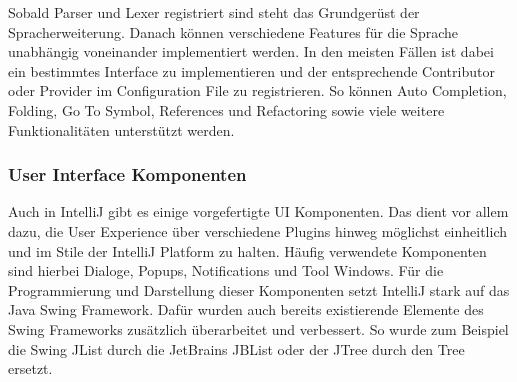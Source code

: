   Sobald Parser und Lexer registriert sind steht das Grundgerüst der Spracherweiterung. Danach können
  verschiedene Features für die Sprache unabhängig voneinander implementiert werden. In den meisten
  Fällen ist dabei ein bestimmtes Interface zu implementieren und der entsprechende Contributor oder
  Provider im Configuration File zu registrieren. So können Auto Completion, Folding, Go To Symbol,
  References und Refactoring sowie viele weitere Funktionalitäten unterstützt werden.

\subsubsection{User Interface Komponenten}
  Auch in IntelliJ gibt es einige vorgefertigte UI Komponenten. Das dient vor allem dazu, die
  User Experience über verschiedene Plugins hinweg möglichst einheitlich und im Stile
  der IntelliJ Platform zu halten. Häufig verwendete Komponenten sind hierbei Dialoge, Popups,
  Notifications und Tool Windows. Für die Programmierung und Darstellung dieser Komponenten
  setzt IntelliJ stark auf das Java Swing Framework. Dafür wurden auch bereits existierende
  Elemente des Swing Frameworks zusätzlich überarbeitet und verbessert. So wurde zum Beispiel
  die Swing JList durch die JetBrains JBList oder der JTree durch den Tree ersetzt.
